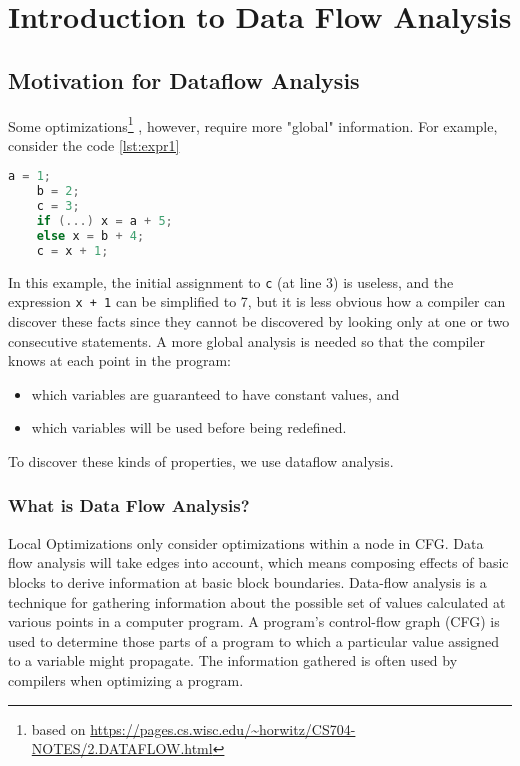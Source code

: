 \newpage
\section{Introduction to Data Flow Analysis}

\subsection{Motivation for Dataflow Analysis}

Some optimizations\footnote{based on \url{https://pages.cs.wisc.edu/~horwitz/CS704-NOTES/2.DATAFLOW.html}} , however, require more "global" information.
For example, consider the code \ref{lst:expr1}

\begin{lstlisting}[language=C,frame=single, caption=An example to illustrate some optimizations require more global information,label = lst:expr1]
    a = 1;
    b = 2;
    c = 3;
    if (...) x = a + 5;
    else x = b + 4;
    c = x + 1;
\end{lstlisting}


In this example, the initial assignment to \texttt{c} (at line 3) is useless, and the expression
\texttt{x + 1} can be simplified to 7, but it is less obvious how a compiler can discover these facts
since they cannot be discovered by looking only at one or two consecutive statements.
A more global analysis is needed so that the compiler knows at each point in the program:
\begin{itemize}
	\item    which variables are guaranteed to have constant values, and
	\item    which variables will be used before being redefined.
\end{itemize}

To discover these kinds of properties, we use dataflow analysis.



\subsubsection{What is Data Flow Analysis?}

Local Optimizations only consider optimizations within a node in CFG.
Data flow analysis will take edges into account, which means composing
effects of basic blocks to derive information at basic block boundaries.
Data-flow analysis is a technique for gathering information about the possible
set of values calculated at various points in a computer program. A program's
control-flow graph (CFG) is used to determine those parts of a program to which
a particular value assigned to a variable might propagate. The information gathered
is often used by compilers when optimizing a program.


